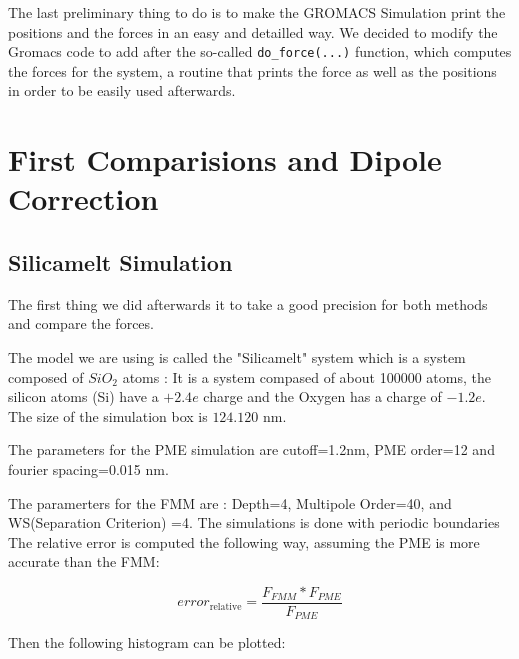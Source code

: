 \documentclass[11pt,twoside,a4paper]{report}
\begin{document}
The last preliminary thing to do is to make the GROMACS Simulation print the positions and the forces in an easy and detailled way. We decided to modify the Gromacs code to add after the so-called {\tt{do\_force(...)}} function, which computes the forces for the system, a routine that prints the force as well as the positions in order to be
 easily used afterwards. 

\section{First Comparisions and Dipole Correction}

\subsection{Silicamelt Simulation}

The first thing we did afterwards it to take a good precision for both methods and compare the forces.

The model we are using is called the "Silicamelt" system which is a system composed of $SiO_2$ atoms : It is a system compased of about 100000 atoms, the silicon atoms (Si) have a $+2.4e$ charge and the Oxygen has a charge of $-1.2e$.
The size of the simulation box is $124.120$ nm.

The parameters for the PME simulation are cutoff=1.2nm, PME order=12 and fourier spacing=0.015 nm. 

The paramerters for the FMM are : Depth=4, Multipole Order=40, and WS(Separation Criterion) =4. The simulations is done with periodic boundaries \\

The relative error is computed the following way, assuming the PME is more accurate than the FMM:

\begin{equation}
	error_{\text{relative}} = \frac{F_{FMM} * F_{PME}}{F_{PME}}
\end{equation}

Then the following histogram can be plotted:
\end{document}
